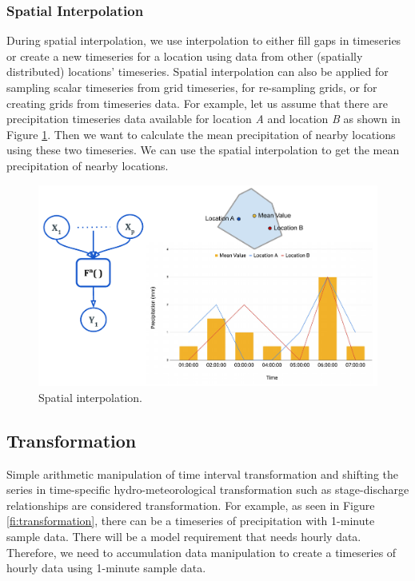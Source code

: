 \subsubsection{Spatial Interpolation}
During spatial interpolation, we use interpolation to either fill gaps in timeseries or create a new timeseries for a location using data from other (spatially distributed) locations' timeseries. Spatial interpolation can also be applied for sampling scalar timeseries from grid timeseries, for re-sampling grids, or for creating grids from timeseries data. For example, let us assume that there are precipitation timeseries data available for location \textit{A} and location \textit{B} as shown in Figure \ref{fi:spatial_interpolation}. Then we want to calculate the mean precipitation of nearby locations using these two timeseries. We can use the spatial interpolation to get the mean precipitation of nearby locations.

\begin{figure}[htp]
    \centering
    \includegraphics[width=1.0\textwidth]{method/data_preprocess/spatial_interpolation.pdf}
    \caption{Spatial interpolation.}
    \label{fi:spatial_interpolation}
\end{figure}

\subsection{Transformation}
Simple arithmetic manipulation of time interval transformation and shifting the series in time-specific hydro-meteorological transformation such as stage-discharge relationships are considered transformation. For example, as seen in Figure \ref{fi:transformation}, there can be a timeseries of precipitation with 1-minute sample data. There will be a model requirement that needs hourly data. Therefore, we need to accumulation data manipulation to create a timeseries of hourly data using 1-minute sample data.

